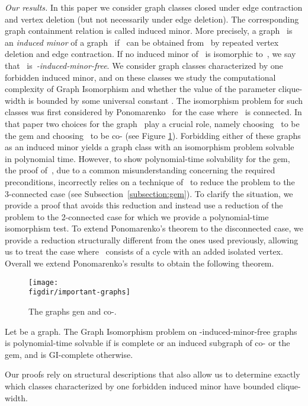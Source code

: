 \documentclass[envcountsame,envcountsect,11pt,a4paper]{llncs}
\newcommand{\figdir}{.}
\begin{document}
{\it Our results.} In this paper we consider graph classes closed under edge contraction and vertex deletion (but not necessarily under edge
deletion). The corresponding graph containment relation is called induced minor. More precisely, a graph~ is an \emph{induced minor} of a
graph~ if~ can be obtained from~ by repeated vertex deletion and edge contraction. If no induced minor of~ is isomorphic to~,
we say that~ is~\emph{-induced-minor-free}. We consider graph classes characterized by one forbidden induced minor, and on these classes we
study the computational complexity of {\sc Graph Isomorphism} and whether the value of the parameter clique-width is bounded by
some universal constant . The isomorphism problem for such classes was first considered by Ponomarenko~\cite{Ponomarenko88} for the
case where~ is connected. In that paper two choices for the graph~ play a crucial role, namely choosing~ to be the gem and
choosing~ to be co- (see Figure \ref{fig:important-graphs}).
Forbidding either of these graphs as an induced minor yields a graph class with an isomorphism problem solvable in polynomial time.
However, to show polynomial-time solvability for the gem, the proof of~\cite{Ponomarenko88}, due to a common misunderstanding concerning the
required preconditions, incorrectly relies on a technique of~\cite{DBLP:conf/coco/HopcroftT72} to reduce the problem to the 3-connected case
(see Subsection~\ref{subsection:gem}). To clarify the situation, we provide a proof that avoids this reduction and instead use a reduction
of the problem to the 2-connected case for which we provide a polynomial-time isomorphism test.
To extend Ponomarenko's theorem to the disconnected case, we provide a reduction structurally different from the ones used previously,
allowing us to treat the case where~ consists of a cycle with an added isolated vertex.
Overall we extend Ponomarenko's results to obtain the following theorem.
\begin{figure}[htb]
  \centering
  \texttt{[image: \\figdir/important-graphs]}
  \caption{The graphs gen and co-.}
  \label{fig:important-graphs}
\end{figure}

\begin{theorem}
Let  be a graph. The {\sc Graph Isomorphism} problem on -induced-minor-free graphs is polynomial-time solvable if  is complete or
an induced subgraph of co- or the gem, and is GI-complete otherwise.
\end{theorem}

Our proofs rely on structural descriptions that also allow us to determine exactly which classes characterized by one forbidden induced
minor have bounded clique-width.
\end{document}
